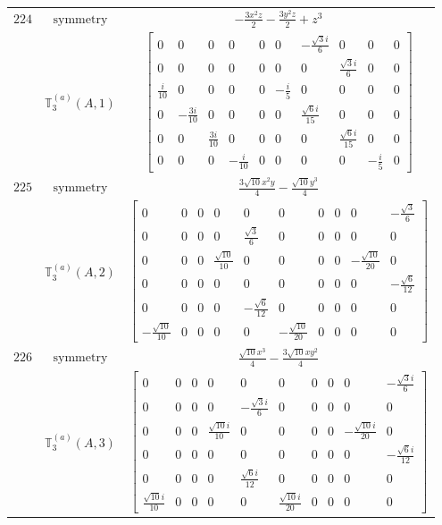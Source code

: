 \documentclass[fleqn,8pt,landscape]{jsarticle}
\begin{document}
\begin{longtable}{ccc}
$ 224 $ & $ \text{symmetry} $ & $ - \frac{3 x^{2} z}{2} - \frac{3 y^{2} z}{2} + z^{3} $ \\
$  $ & $ \mathbb{T}_{3}^{(a)}(A,1) $ & $ \begin{bmatrix} 0 & 0 & 0 & 0 & 0 & 0 & - \frac{\sqrt{3} i}{6} & 0 & 0 & 0 \\ 0 & 0 & 0 & 0 & 0 & 0 & 0 & \frac{\sqrt{3} i}{6} & 0 & 0 \\ \frac{i}{10} & 0 & 0 & 0 & 0 & - \frac{i}{5} & 0 & 0 & 0 & 0 \\ 0 & - \frac{3 i}{10} & 0 & 0 & 0 & 0 & \frac{\sqrt{6} i}{15} & 0 & 0 & 0 \\ 0 & 0 & \frac{3 i}{10} & 0 & 0 & 0 & 0 & \frac{\sqrt{6} i}{15} & 0 & 0 \\ 0 & 0 & 0 & - \frac{i}{10} & 0 & 0 & 0 & 0 & - \frac{i}{5} & 0 \end{bmatrix} $ \\ \hline
$ 225 $ & $ \text{symmetry} $ & $ \frac{3 \sqrt{10} x^{2} y}{4} - \frac{\sqrt{10} y^{3}}{4} $ \\
$  $ & $ \mathbb{T}_{3}^{(a)}(A,2) $ & $ \begin{bmatrix} 0 & 0 & 0 & 0 & 0 & 0 & 0 & 0 & 0 & - \frac{\sqrt{3}}{6} \\ 0 & 0 & 0 & 0 & \frac{\sqrt{3}}{6} & 0 & 0 & 0 & 0 & 0 \\ 0 & 0 & 0 & \frac{\sqrt{10}}{10} & 0 & 0 & 0 & 0 & - \frac{\sqrt{10}}{20} & 0 \\ 0 & 0 & 0 & 0 & 0 & 0 & 0 & 0 & 0 & - \frac{\sqrt{6}}{12} \\ 0 & 0 & 0 & 0 & - \frac{\sqrt{6}}{12} & 0 & 0 & 0 & 0 & 0 \\ - \frac{\sqrt{10}}{10} & 0 & 0 & 0 & 0 & - \frac{\sqrt{10}}{20} & 0 & 0 & 0 & 0 \end{bmatrix} $ \\ \hline
$ 226 $ & $ \text{symmetry} $ & $ \frac{\sqrt{10} x^{3}}{4} - \frac{3 \sqrt{10} x y^{2}}{4} $ \\
$  $ & $ \mathbb{T}_{3}^{(a)}(A,3) $ & $ \begin{bmatrix} 0 & 0 & 0 & 0 & 0 & 0 & 0 & 0 & 0 & - \frac{\sqrt{3} i}{6} \\ 0 & 0 & 0 & 0 & - \frac{\sqrt{3} i}{6} & 0 & 0 & 0 & 0 & 0 \\ 0 & 0 & 0 & \frac{\sqrt{10} i}{10} & 0 & 0 & 0 & 0 & - \frac{\sqrt{10} i}{20} & 0 \\ 0 & 0 & 0 & 0 & 0 & 0 & 0 & 0 & 0 & - \frac{\sqrt{6} i}{12} \\ 0 & 0 & 0 & 0 & \frac{\sqrt{6} i}{12} & 0 & 0 & 0 & 0 & 0 \\ \frac{\sqrt{10} i}{10} & 0 & 0 & 0 & 0 & \frac{\sqrt{10} i}{20} & 0 & 0 & 0 & 0 \end{bmatrix} $ \\ \hline

\end{longtable}
\end{document}

